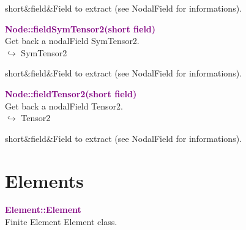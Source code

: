 \begin{tcolorbox}[width=\textwidth,myArgs,tabularx={ll|R}]
short&field&Field to extract (see NodalField for informations).
\end{tcolorbox}



\textcolor{purple}{\textbf{Node::fieldSymTensor2(short field)}}\label{Node::fieldSymTensor2(short field)}\\
Get back a nodalField SymTensor2.\\ \hspace*{10mm}$\hookrightarrow$ SymTensor2

\begin{tcolorbox}[width=\textwidth,myArgs,tabularx={ll|R}]
short&field&Field to extract (see NodalField for informations).
\end{tcolorbox}


\textcolor{purple}{\textbf{Node::fieldTensor2(short field)}}\label{Node::fieldTensor2(short field)}\\
Get back a nodalField Tensor2.\\ \hspace*{10mm}$\hookrightarrow$ Tensor2

\begin{tcolorbox}[width=\textwidth,myArgs,tabularx={ll|R}]
short&field&Field to extract (see NodalField for informations).
\end{tcolorbox}


\section{Elements}

\textcolor{purple}{\textbf{Element::Element}}\label{Element::Element}\\
Finite Element Element class.

